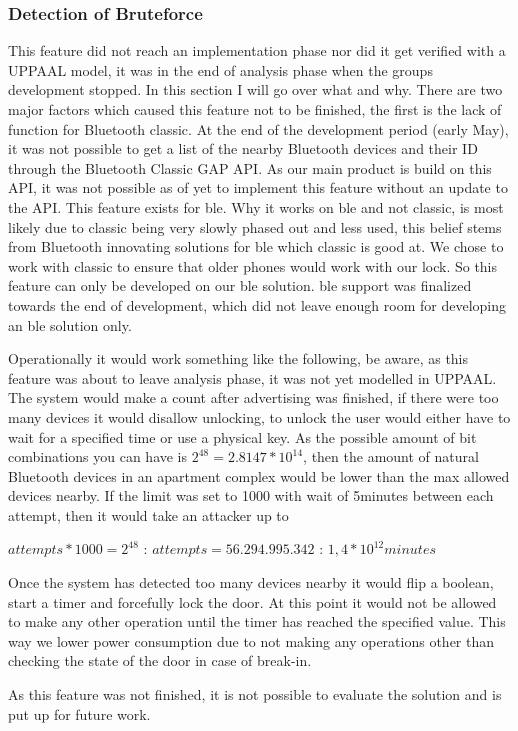\subsubsection{Detection of Bruteforce}
This feature did not reach an implementation phase nor did it get verified with a UPPAAL model, it was in the end of analysis phase when the groups development stopped. In this section I will go over what and why. There are two major factors which caused this feature not to be finished, the first is the lack of function for Bluetooth classic\cite{ESPClassicAPI}. At the end of the development period (early May), it was not possible to get a list of the nearby Bluetooth devices and their ID through the Bluetooth Classic GAP API. As our main product is build on this API, it was not possible as of yet to implement this feature without an update to the API. This feature exists for \gls{ble}\cite{ESPBLEGAP}. Why it works on \gls{ble} and not classic, is most likely due to classic being very slowly phased out and less used, this belief stems from Bluetooth innovating solutions for \gls{ble} which classic is good at\cite{BLEAudio}. We chose to work with classic to ensure that older phones would work with our lock. So this feature can only be developed on our \gls{ble} solution. \gls{ble} support was finalized towards the end of development, which did not leave enough room for developing an \gls{ble} solution only.

Operationally it would work something like the following, be aware, as this feature was about to leave analysis phase, it was not yet modelled in UPPAAL. The system would make a count after advertising was finished, if there were too many devices it would disallow unlocking, to unlock the user would either have to wait for a specified time or use a physical key. As the possible amount of bit combinations you can have is $2^{48}=2.8147*10^{14}$, then the amount of natural Bluetooth devices in an apartment complex would be lower than the max allowed devices nearby. If the limit was set to 1000 with wait of 5minutes between each attempt, then it would take an attacker up to 
\begin{center}
$attempts*1000=2^{48}$ : $attempts=56.294.995.342$ : $1,4*10^{12}minutes$
\end{center}
Once the system has detected too many devices nearby it would flip a boolean, start a timer and forcefully lock the door. At this point it would not be allowed to make any other operation until the timer has reached the specified value. This way we lower power consumption due to not making any operations other than checking the state of the door in case of break-in.

As this feature was not finished, it is not possible to evaluate the solution and is put up for future work.